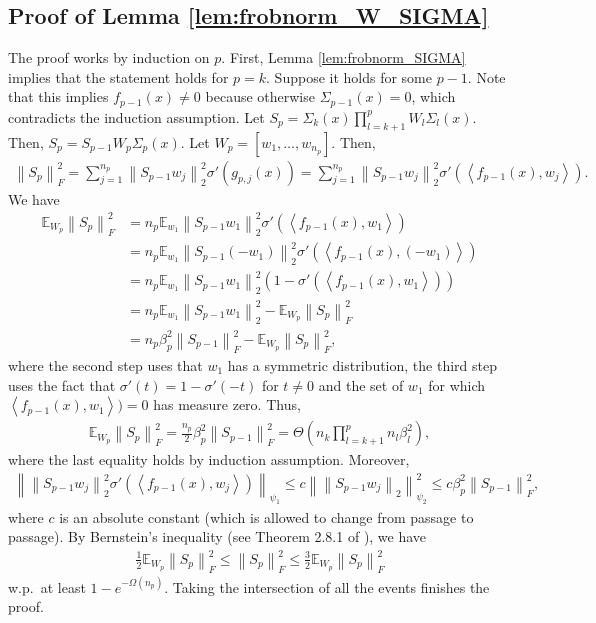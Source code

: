\documentclass[11pt]{article}
\newcommand{\E}{\mathbb{E}}
\newenvironment{proof}{\par\noindent{\bf Proof:\ }}{\hfill$\Box$\\[2mm]}
\newcommand{\bigOmg}[1]{\Omega\left(#1\right)}
\newcommand{\bigTheta}[1]{\Theta\left(#1\right)}
\newcommand{\inner}[1]{\left\langle#1\right\rangle}
\newcommand{\norm}[1]{\left\|#1\right\|}
\def\Bernstein{Theorem 2.8.1 of \cite{vershynin2018high}}
\begin{document}
\subsection{Proof of Lemma \ref{lem:frobnorm_W_SIGMA}}
    The proof works by induction on $p.$
    First, Lemma \ref{lem:frobnorm_SIGMA} implies that the statement holds for $p=k.$
    Suppose it holds for some $p-1.$
    Note that this implies $f_{p-1}(x)\neq 0$ because otherwise $\Sigma_{p-1}(x)=0$, which contradicts the induction assumption.
    Let $S_p=\Sigma_{k}(x)\prod_{l=k+1}^{p} W_l\Sigma_l(x).$
    Then, $S_p=S_{p-1} W_p\Sigma_p(x).$
    Let $W_p=[w_1,\ldots,w_{n_p}].$
    Then,
    \begin{align*}
	\norm{S_p}_F^2 
	= \sum_{j=1}^{n_p} \norm{S_{p-1}w_j}_2^2 \sigma'(g_{p,j}(x))
	= \sum_{j=1}^{n_p} \norm{S_{p-1}w_j}_2^2 \sigma'(\inner{f_{p-1}(x),w_j}).
    \end{align*}
    We have 
    \begin{align*}
	\E_{W_p} \norm{S_p}_F^2
	&= n_p \E_{w_1} \norm{S_{p-1}w_1}_2^2 \sigma'(\inner{f_{p-1}(x),w_1}) \\
	&= n_p \E_{w_1} \norm{S_{p-1}(-w_1)}_2^2 \sigma'(\inner{f_{p-1}(x),(-w_1)}) \\
	&= n_p \E_{w_1} \norm{S_{p-1}w_1}_2^2 (1-\sigma'(\inner{f_{p-1}(x),w_1})) \\
	&= n_p \E_{w_1} \norm{S_{p-1}w_1}_2^2 - \E_{W_p} \norm{S_p}_F^2 \\
	&= n_p \beta_p^2 \norm{S_{p-1}}_F^2 - \E_{W_p} \norm{S_p}_F^2 ,
    \end{align*}
    where the second step uses that $w_1$ has a symmetric distribution, the third step uses the fact that $\sigma'(t)=1-\sigma'(-t)$ for $t\neq 0$
    and the set of $w_1$ for which $\inner{f_{p-1}(x),w_1})=0$ has measure zero.
    Thus,
    \begin{align*}
	\E_{W_p} \norm{S_p}_F^2 = \frac{n_p}{2} \beta_p^2 \norm{S_{p-1}}_F^2 
	= \bigTheta{n_{k} \prod_{l=k+1}^{p} n_l\beta_l^2},
    \end{align*}
    where the last equality holds by induction assumption.
    Moreover,
    \begin{align*}
	\norm{ \norm{S_{p-1}w_j}_2^2 \sigma'(\inner{f_{p-1}(x),w_j}) }_{\psi_1}
	\le c \norm{ \norm{S_{p-1}w_j}_2 }_{\psi_2}^2 
	\le c \beta_p^2 \norm{S_{p-1}}_F^2 ,
    \end{align*}
    where $c$ is an absolute constant (which is allowed to change from passage to passage).
    By Bernstein's inequality (see \Bernstein), we have 
     \begin{align*}
	\frac{1}{2} \E_{W_p}\norm{S_p}_F^2 \leq \norm{S_p}_F^2 \leq \frac{3}{2} \E_{W_p}\norm{S_p}_F^2
     \end{align*}
    w.p.\ at least $1-e^{-\bigOmg{n_p}}.$
    Taking the intersection of all the events finishes the proof.
\end{document}
